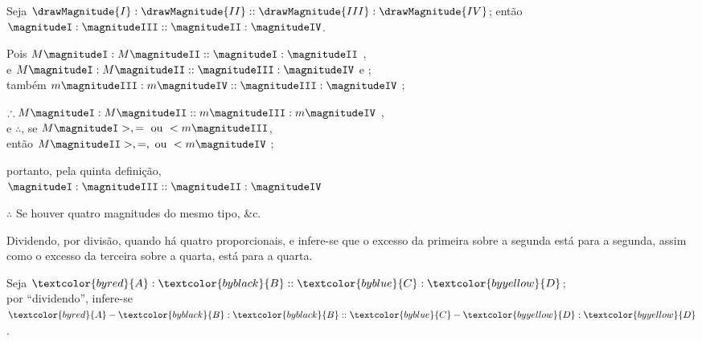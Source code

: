 \documentclass[booklanguage=brazilian]{byrnebook}
\begin{document}
\vfill\pagebreak

\label{prop:V.XVI}

\begin{center}
Seja $\drawMagnitude{I} : \drawMagnitude{II} :: \drawMagnitude{III} : \drawMagnitude{IV}$; então $\magnitudeI : \magnitudeIII :: \magnitudeII : \magnitudeIV$.

Pois $M \magnitudeI : M \magnitudeII :: \magnitudeI : \magnitudeII$ ,\\
e $M \magnitudeI : M \magnitudeII :: \magnitudeIII : \magnitudeIV$ \byref{\hypref} e ;\\
também $m \magnitudeIII : m \magnitudeIV :: \magnitudeIII : \magnitudeIV$ ;

$\therefore M \magnitudeI : M \magnitudeII :: m \magnitudeIII : m \magnitudeIV$ ,\\
e $\therefore$, se $M \magnitudeI >, = \mbox { ou } < m \magnitudeIII$,\\
então $M \magnitudeII >, =, \mbox{ ou } < m \magnitudeIV$ ;

portanto, pela quinta definição,\\
 $\magnitudeI : \magnitudeIII :: \magnitudeII : \magnitudeIV$

 $\therefore$ Se houver quatro magnitudes do mesmo tipo, \&c.
\end{center}

\label{def:V.XVI}
\def\varA{\textcolor{byred}{A}}
\def\varB{\textcolor{byblack}{B}}
\def\varC{\textcolor{byblue}{C}}
\def\varD{\textcolor{byyellow}{D}}
Dividendo, por divisão, quando há quatro proporcionais, e infere-se que o excesso da primeira sobre a segunda está para a segunda, assim como o excesso da terceira sobre a quarta, está para a quarta.

\begin{center}
Seja $\varA : \varB :: \varC : \varD$;\\
por \enquote{dividendo}, infere-se\\
$\varA - \varB : \varB :: \varC - \varD : \varD$. %
\end{center}
\end{document}
